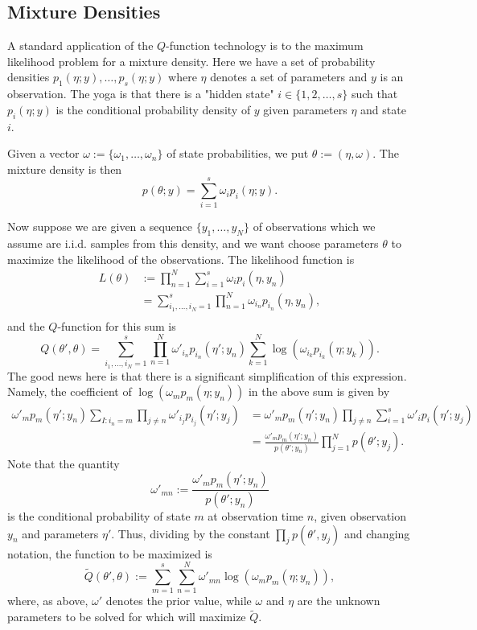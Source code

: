 \documentclass[12pt,leqno]{article}
\begin{document}
\subsection{Mixture Densities}\label{MD}
A standard application of the $Q$-function technology is to the maximum
likelihood problem for a mixture density.  Here we have a set of
probability densities $p_1(\eta;y),\dots,p_s(\eta;y)$ where $\eta$
denotes a set of parameters and $y$ is an observation.  The yoga is that there
is a "hidden state" $i\in\{1,2,\dots,s\}$ such that $p_i(\eta;y)$ is the
conditional probability density of $y$ given parameters $\eta$ and state $i$.

Given a vector $\omega:= \{\omega_1,\dots,\omega_n\}$ of state probabilities, we put
$\theta:= (\eta,\omega)$.  The mixture density is then
$$
p(\theta;y) = \sum_{i=1}^s\omega_ip_i(\eta;y).
$$

Now suppose we are given a sequence $\{y_1,\dots,y_N\}$ of observations which we
assume are i.i.d. samples from this density,
and we want choose parameters $\theta$ to maximize the likelihood of the observations.
The likelihood function is  
\begin{equation*} \begin{split} 
L(\theta)
&:= \prod_{n=1}^N\sum_{i=1}^s\omega_ip_i(\eta,y_n) \\ 
&=
\sum_{i_1,\dots,i_N=1}^s\prod_{n=1}^N\omega_{i_n}p_{i_n}(\eta,y_n), \\ 
\end{split} 
\end{equation*} 
and the $Q$-function for this sum is 
$$
Q(\theta',\theta) = \sum_{i_1,\dots,i_N=1}^s\prod_{n=1}^N\omega'_{i_n}p_{i_n}(\eta';y_n)
\sum_{k=1}^N\log(\omega_{i_k}p_{i_k}(\eta;y_k)).
$$
The good news here is that there is a significant simplification of this expression.
Namely, the coefficient of $\log(\omega_mp_m(\eta;y_n))$ in the above sum is given by
\begin{align*}
\omega'_mp_m(\eta';y_n)\sum_{I:i_n = m}\prod_{j\neq n}\omega'_{i_j}p_{i_j}(\eta';y_j )
&=\omega'_mp_m(\eta';y_n)\prod_{j\neq n}\sum_{i=1}^s\omega'_ip_i(\eta';y_j)\\
&= \frac{\omega'_mp_m(\eta';y_n)}{p(\theta';y_n)}\prod_{j=1}^Np(\theta';y_j).
\end{align*}
Note that the quantity 
\begin{equation}\label{omega_mn}
\omega'_{mn} := \frac{\omega'_mp_m(\eta';y_n)}{p(\theta';y_n)}
\end{equation}
is the conditional probability of state $m$ at observation time $n$, given observation $y_n$ 
and parameters $\eta'$.
Thus, dividing by the constant $\prod_jp(\theta',y_j)$ and changing notation, the function to be
maximized is
\begin{equation}\label{Qfunc:0}
\tilde{Q}(\theta',\theta) := \sum_{m=1}^s\sum_{n=1}^N\omega'_{mn}\log(\omega_mp_m(\eta;y_n)),
\end{equation}
where, as above, $\omega'$ denotes the prior value, while $\omega$ and $\eta$ are the unknown parameters
to be solved for which will maximize $\tilde{Q}$.
\end{document}
